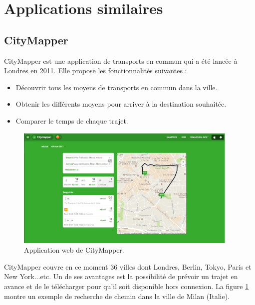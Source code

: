 \section{Applications similaires}			
\subsection{CityMapper}
CityMapper est une application de transports en commun qui a été lancée à Londres en 2011.
Elle propose les fonctionnalités suivantes : 
\begin{itemize}
	\item Découvrir tous les moyens de transports en commun dans la ville.
	\item Obtenir les différents moyens pour arriver à la destination souhaitée.
	\item Comparer le temps de chaque trajet.
\end{itemize}

\begin{figure}[h!]
	\center
	\includegraphics[width=0.95\textwidth]{img/citymapper.png}
	\caption{Application web de CityMapper.}
	\label{fig:CityMapper}
\end{figure}

CityMapper couvre en ce moment 36 villes dont Londres, Berlin, Tokyo, Paris et New York...etc.  Un de ses avantages est la possibilité de prévoir un trajet en avance et de le télécharger pour qu'il soit disponible hors connexion.
La figure \ref{fig:CityMapper} montre un exemple de recherche de chemin dans la ville de Milan (Italie).

